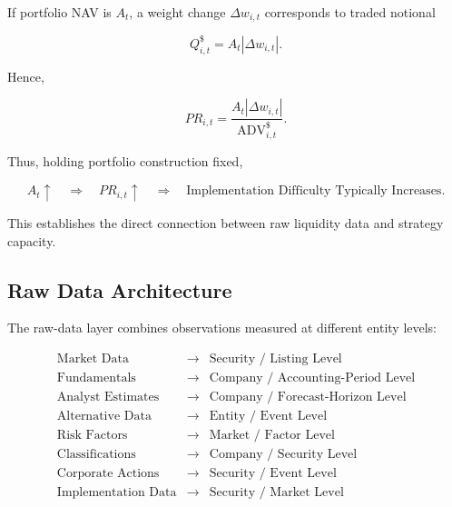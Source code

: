 \documentclass[11pt,a4paper]{article}
\begin{document}
If portfolio NAV is $A_t$, a weight change $\Delta w_{i,t}$ corresponds to
traded notional

\begin{equation}
Q_{i,t}^{\$}
=
A_t
|\Delta w_{i,t}|.
\end{equation}

Hence,

\begin{equation}
PR_{i,t}
=
\frac{
A_t|\Delta w_{i,t}|
}{
\mathrm{ADV}_{i,t}^{\$}
}.
\end{equation}

Thus, holding portfolio construction fixed,

\begin{equation}
\boxed{
A_t \uparrow
\quad\Rightarrow\quad
PR_{i,t} \uparrow
\quad\Rightarrow\quad
\text{Implementation Difficulty Typically Increases}.
}
\end{equation}

This establishes the direct connection between raw liquidity data and strategy
capacity.


\subsection{Raw Data Architecture}
\label{subsec:raw_data_architecture}

The raw-data layer combines observations measured at different entity levels:

\begin{equation}
\boxed{
\begin{array}{ccc}
\text{Market Data}
&
\rightarrow
&
\text{Security / Listing Level}
\\[0.15cm]
\text{Fundamentals}
&
\rightarrow
&
\text{Company / Accounting-Period Level}
\\[0.15cm]
\text{Analyst Estimates}
&
\rightarrow
&
\text{Company / Forecast-Horizon Level}
\\[0.15cm]
\text{Alternative Data}
&
\rightarrow
&
\text{Entity / Event Level}
\\[0.15cm]
\text{Risk Factors}
&
\rightarrow
&
\text{Market / Factor Level}
\\[0.15cm]
\text{Classifications}
&
\rightarrow
&
\text{Company / Security Level}
\\[0.15cm]
\text{Corporate Actions}
&
\rightarrow
&
\text{Security / Event Level}
\\[0.15cm]
\text{Implementation Data}
&
\rightarrow
&
\text{Security / Market Level}
\end{array}
}
\end{equation}
\end{document}
